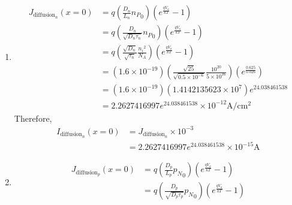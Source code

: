 \documentclass[fleqn, a4paper, 10pt, oneside]{amsart}
\theoremstyle{definition}
\theoremstyle{theorem}
\begin{document}
\begin{solution}
	\begin{enumerate}[leftmargin=*]
		\item
			\begin{align*}
				J_{\text{diffusion}_n}(x = 0) & = q \left( \frac{D_n}{L_n} {n_P}_0 \right) \left( e^{\frac{q V_a}{k T}} - 1 \right)                                                                                     \\
                                                              & = q \left( \frac{D_n}{\sqrt{D_n \tau_n}} {n_P}_0 \right) \left( e^{\frac{q V_a}{k T}} - 1 \right)                                                                       \\
                                                              & = q \left( \frac{\sqrt{D_n}}{\sqrt{\tau_n}} \frac{{n_i}^2}{N_A} \right) \left( e^{\frac{q V_a}{k T}} - 1 \right)                                                        \\
                                                              & = \left( 1.6 \times 10^{-19} \right) \left( \frac{\sqrt{25}}{\sqrt{0.5 \times 10^{-6}}} \frac{10^{20}}{5 \times 10^{16}} \right) \left( e^{\frac{0.625}{0.026}} \right) \\
                                                              & = \left( 1.6 \times 10^{-19} \right) \left( 1.4142135623 \times 10^7 \right) e^{24.038461538}                                                                           \\
                                                              & = 2.2627416997 e^{24.038461538} \times 10^{-12} \si{\ampere\per\centi\metre\squared}
			\end{align*}
			Therefore,
			\begin{align*}
				I_{\text{diffusion}_n}(x = 0) & = J_{\text{diffusion}_n} \times 10^{-3} \\
                                                              & = 2.2627416997 e^{24.038461538} \times 10^{-15} \si{\ampere}
			\end{align*}
		\item
			\begin{align*}
				J_{\text{diffusion}_p}(x = 0) & = q \left( \frac{D_p}{L_p} {p_N}_0 \right) \left( e^{\frac{q V_a}{k T}} - 1 \right)                                                                            \\
                                                              & = q \left( \frac{D_p}{\sqrt{D_p \tau_p}} {p_N}_0 \right) \left( e^{\frac{q V_a}{k T}} - 1 \right)                                                              \\

\end{align*}
\end{enumerate}
\end{solution}
\end{document}
